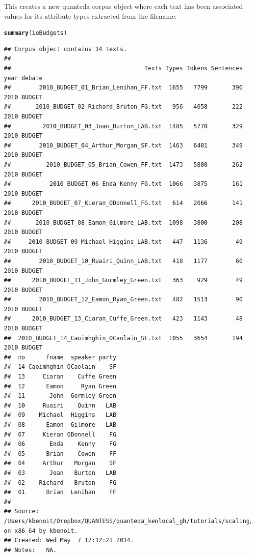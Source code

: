 \documentclass{article}\usepackage[]{graphicx}\usepackage[]{color}
\makeatletter
\newcommand{\hlstd}[1]{\textcolor[rgb]{0.345,0.345,0.345}{#1}}%
\newcommand{\hlkwd}[1]{\textcolor[rgb]{0.737,0.353,0.396}{\textbf{#1}}}%
\newenvironment{kframe}{%
 \def\at@end@of@kframe{}%
 \ifinner\ifhmode%
  \def\at@end@of@kframe{\end{minipage}}%
  \begin{minipage}{\columnwidth}%
 \fi\fi%
 \def\FrameCommand##1{\hskip\@totalleftmargin \hskip-\fboxsep
 \colorbox{shadecolor}{##1}\hskip-\fboxsep
     \hskip-\linewidth \hskip-\@totalleftmargin \hskip\columnwidth}%
 \MakeFramed {\advance\hsize-\width
   \@totalleftmargin\z@ \linewidth\hsize
   \@setminipage}}%
 {\par\unskip\endMakeFramed%
 \at@end@of@kframe}
\newenvironment{knitrout}{}{} %
\makeatother
\begin{document}
This creates a new quanteda corpus object where each text has been associated values for its attribute types extracted from the filename:

\begin{knitrout}
\color{fgcolor}\begin{kframe}
\begin{alltt}
\hlkwd{summary}\hlstd{(ieBudgets)}
\end{alltt}
\begin{verbatim}
## Corpus object contains 14 texts.
## 
##                                      Texts Types Tokens Sentences year debate
##        2010_BUDGET_01_Brian_Lenihan_FF.txt  1655   7799       390 2010 BUDGET
##       2010_BUDGET_02_Richard_Bruton_FG.txt   956   4058       222 2010 BUDGET
##         2010_BUDGET_03_Joan_Burton_LAB.txt  1485   5770       329 2010 BUDGET
##        2010_BUDGET_04_Arthur_Morgan_SF.txt  1463   6481       349 2010 BUDGET
##          2010_BUDGET_05_Brian_Cowen_FF.txt  1473   5880       262 2010 BUDGET
##           2010_BUDGET_06_Enda_Kenny_FG.txt  1066   3875       161 2010 BUDGET
##      2010_BUDGET_07_Kieran_ODonnell_FG.txt   614   2066       141 2010 BUDGET
##       2010_BUDGET_08_Eamon_Gilmore_LAB.txt  1098   3800       208 2010 BUDGET
##     2010_BUDGET_09_Michael_Higgins_LAB.txt   447   1136        49 2010 BUDGET
##        2010_BUDGET_10_Ruairi_Quinn_LAB.txt   418   1177        60 2010 BUDGET
##      2010_BUDGET_11_John_Gormley_Green.txt   363    929        49 2010 BUDGET
##        2010_BUDGET_12_Eamon_Ryan_Green.txt   482   1513        90 2010 BUDGET
##      2010_BUDGET_13_Ciaran_Cuffe_Green.txt   423   1143        48 2010 BUDGET
##  2010_BUDGET_14_Caoimhghin_OCaolain_SF.txt  1055   3654       194 2010 BUDGET
##  no      fname  speaker party
##  14 Caoimhghin OCaolain    SF
##  13     Ciaran    Cuffe Green
##  12      Eamon     Ryan Green
##  11       John  Gormley Green
##  10     Ruairi    Quinn   LAB
##  09    Michael  Higgins   LAB
##  08      Eamon  Gilmore   LAB
##  07     Kieran ODonnell    FG
##  06       Enda    Kenny    FG
##  05      Brian    Cowen    FF
##  04     Arthur   Morgan    SF
##  03       Joan   Burton   LAB
##  02    Richard   Bruton    FG
##  01      Brian  Lenihan    FF
## 
## Source:  /Users/kbenoit/Dropbox/QUANTESS/quanteda_kenlocal_gh/tutorials/scaling/* on x86_64 by kbenoit.
## Created: Wed May  7 17:12:21 2014.
## Notes:   NA.
\end{verbatim}
\end{kframe}
\end{knitrout}
\end{document}

